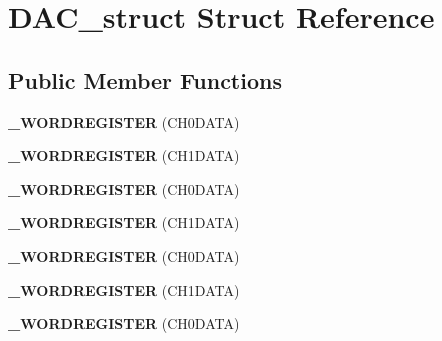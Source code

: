 \hypertarget{struct_d_a_c__struct}{}\section{D\+A\+C\+\_\+struct Struct Reference}
\label{struct_d_a_c__struct}
\subsection*{Public Member Functions}
\begin{DoxyCompactItemize}
\item 
{\bfseries \+\_\+\+W\+O\+R\+D\+R\+E\+G\+I\+S\+T\+ER} (C\+H0\+D\+A\+TA)\hypertarget{struct_d_a_c__struct_ade7f5cbb61d511c014846c5f8d035093}{}\label{struct_d_a_c__struct_ade7f5cbb61d511c014846c5f8d035093}

\item 
{\bfseries \+\_\+\+W\+O\+R\+D\+R\+E\+G\+I\+S\+T\+ER} (C\+H1\+D\+A\+TA)\hypertarget{struct_d_a_c__struct_a1b46955ff6abaa3b9564ee5c3680ec1c}{}\label{struct_d_a_c__struct_a1b46955ff6abaa3b9564ee5c3680ec1c}

\item 
{\bfseries \+\_\+\+W\+O\+R\+D\+R\+E\+G\+I\+S\+T\+ER} (C\+H0\+D\+A\+TA)\hypertarget{struct_d_a_c__struct_ade7f5cbb61d511c014846c5f8d035093}{}\label{struct_d_a_c__struct_ade7f5cbb61d511c014846c5f8d035093}

\item 
{\bfseries \+\_\+\+W\+O\+R\+D\+R\+E\+G\+I\+S\+T\+ER} (C\+H1\+D\+A\+TA)\hypertarget{struct_d_a_c__struct_a1b46955ff6abaa3b9564ee5c3680ec1c}{}\label{struct_d_a_c__struct_a1b46955ff6abaa3b9564ee5c3680ec1c}

\item 
{\bfseries \+\_\+\+W\+O\+R\+D\+R\+E\+G\+I\+S\+T\+ER} (C\+H0\+D\+A\+TA)\hypertarget{struct_d_a_c__struct_ade7f5cbb61d511c014846c5f8d035093}{}\label{struct_d_a_c__struct_ade7f5cbb61d511c014846c5f8d035093}

\item 
{\bfseries \+\_\+\+W\+O\+R\+D\+R\+E\+G\+I\+S\+T\+ER} (C\+H1\+D\+A\+TA)\hypertarget{struct_d_a_c__struct_a1b46955ff6abaa3b9564ee5c3680ec1c}{}\label{struct_d_a_c__struct_a1b46955ff6abaa3b9564ee5c3680ec1c}

\item 
{\bfseries \+\_\+\+W\+O\+R\+D\+R\+E\+G\+I\+S\+T\+ER} (C\+H0\+D\+A\+TA)\hypertarget{struct_d_a_c__struct_ade7f5cbb61d511c014846c5f8d035093}{}\label{struct_d_a_c__struct_ade7f5cbb61d511c014846c5f8d035093}


\end{DoxyCompactItemize}
